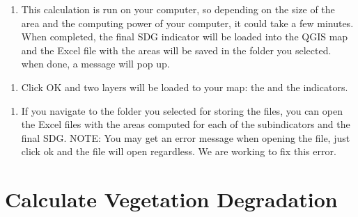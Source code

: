 \documentclass[letterpaper,10pt,english]{sphinxmanual}
\begin{document}
\begin{enumerate}
%
\setcounter{enumi}{5}
\item {} 
\sphinxAtStartPar
This calculation is run on your computer, so depending on the size of the
area and the computing power of your computer, it could take a few minutes.
When completed, the final SDG indicator will be loaded into the QGIS map and
the Excel file with the areas will be saved in the folder you selected. when
done, a message will pop up.

\end{enumerate}

\begin{enumerate}
%
\setcounter{enumi}{6}
\item {} 
\sphinxAtStartPar
Click OK and two layers will be loaded to your map: the  and the  indicators.

\end{enumerate}

\begin{enumerate}
%
\setcounter{enumi}{7}
\item {} 
\sphinxAtStartPar
If you navigate to the folder you selected for storing the files, you can
open the Excel files with the areas computed for each of the sub\sphinxhyphen{}indicators
and the final SDG. NOTE: You may get an error message when opening the file,
just click ok and the file will open regardless. We are working to fix this
error.

\end{enumerate}


\sphinxstepscope


\chapter{Calculate Vegetation Degradation}
\label{\detokenize{Qgis_Plugin/Calculate_vegetation:calculate-vegetation-degradation}}\label{\detokenize{Qgis_Plugin/Calculate_vegetation::doc}}
\end{document}
